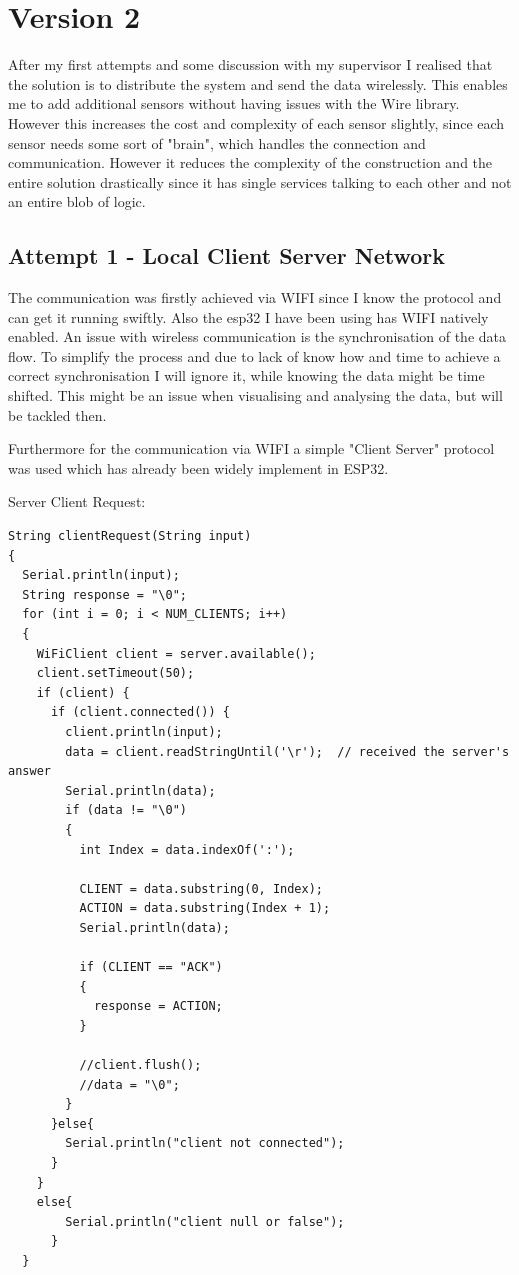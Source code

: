 \chapter*{Version 2}
\label{chap:Technical CHallenges}
\renewcommand{\thesection}{\arabic{section}}
\setcounter{section}{0}

After my first attempts and some discussion with my supervisor I realised that the solution is to distribute the system and send the data wirelessly. This enables me to add additional sensors without having issues with the Wire library. However this increases the cost and complexity of each sensor slightly, since each sensor needs some sort of "brain", which handles the connection and communication. 
However it reduces the complexity of the construction and the entire solution drastically since it has single services talking to each other and not an entire blob of logic. 

\section{Attempt 1 - Local Client Server Network}

The communication was firstly achieved via WIFI since I know the protocol and can get it running swiftly. Also the esp32 I have been using has WIFI natively enabled. 
An issue with wireless communication is the synchronisation of the data flow. To simplify the process and due to lack of know how and time to achieve a correct synchronisation I will ignore it, while knowing the data might be time shifted. 
This might be an issue when visualising and analysing the data, but will be tackled then.

Furthermore for the communication via WIFI a simple "Client Server" protocol was used which has already been widely implement in ESP32.

Server Client Request: 
\begin{lstlisting}
String clientRequest(String input)
{
  Serial.println(input);
  String response = "\0";
  for (int i = 0; i < NUM_CLIENTS; i++)
  {
    WiFiClient client = server.available();
    client.setTimeout(50);
    if (client) {
      if (client.connected()) {
        client.println(input);
        data = client.readStringUntil('\r');  // received the server's answer
        Serial.println(data);
        if (data != "\0")
        {
          int Index = data.indexOf(':');
        
          CLIENT = data.substring(0, Index);
          ACTION = data.substring(Index + 1);
          Serial.println(data);
   
          if (CLIENT == "ACK")
          {
            response = ACTION;
          }

          //client.flush();
          //data = "\0";
        }
      }else{
        Serial.println("client not connected");
      }
    }
    else{
        Serial.println("client null or false");
      }
  }
\end{lstlisting}


